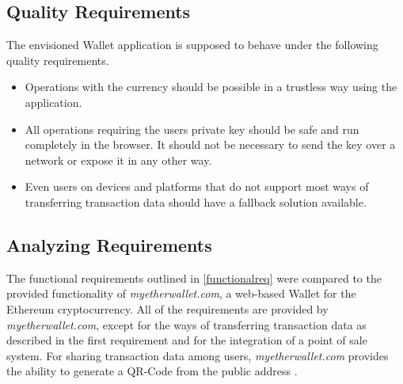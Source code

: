 \subsection{Quality Requirements}\label{qualityrequirements}
The envisioned Wallet application is supposed to behave under the following quality requirements. %
\begin{itemize}
\item Operations with the currency should be possible in a trustless way using the application.
\item All operations requiring the users private key should be safe and run completely in the browser. It should not be necessary to send the key over a network or expose it in any other way.
\item Even users on devices and platforms that do not support most ways of transferring transaction data should have a fallback solution available.

\end{itemize}
\subsection{Analyzing Requirements}

The functional requirements outlined in \ref{functionalreq} were compared to %
the provided functionality of \textit{myetherwallet.com}, a web-based Wallet for the Ethereum cryptocurrency. All of the requirements are provided by \textit{myetherwallet.com}, except for the ways of transferring transaction data as described in the first requirement and for the integration of a point of sale system. For sharing transaction data among users, \textit{myetherwallet.com} provides the ability to generate a QR-Code from the public address \cite{myethwallet}. %

